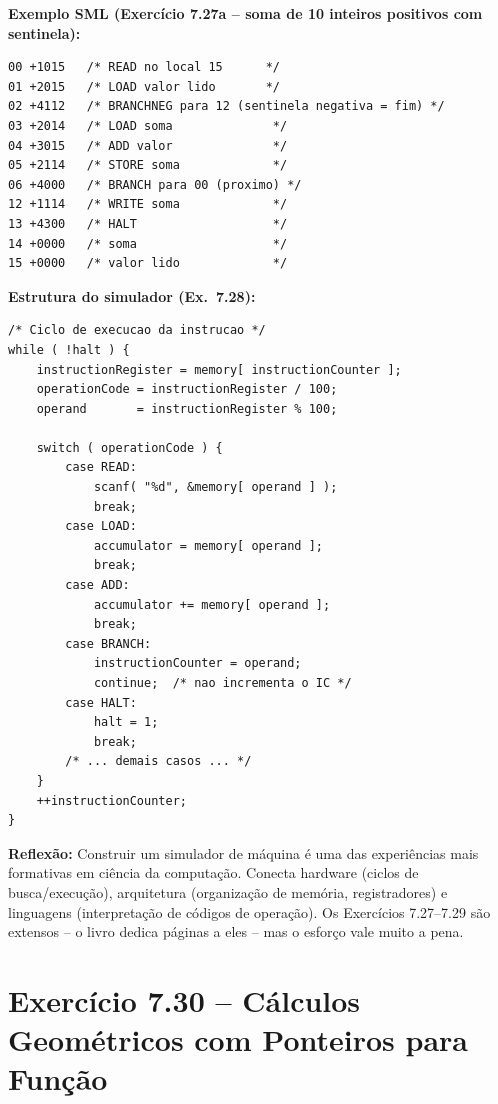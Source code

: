\documentclass[12pt,a4paper]{article}
\begin{document}
\begin{respostabox}
\textbf{Exemplo SML (Exercício 7.27a -- soma de 10 inteiros positivos com sentinela):}
\begin{lstlisting}
00 +1015   /* READ no local 15      */
01 +2015   /* LOAD valor lido       */
02 +4112   /* BRANCHNEG para 12 (sentinela negativa = fim) */
03 +2014   /* LOAD soma              */
04 +3015   /* ADD valor              */
05 +2114   /* STORE soma             */
06 +4000   /* BRANCH para 00 (proximo) */
12 +1114   /* WRITE soma             */
13 +4300   /* HALT                   */
14 +0000   /* soma                   */
15 +0000   /* valor lido             */
\end{lstlisting}

\textbf{Estrutura do simulador (Ex.\ 7.28):}
\begin{lstlisting}
/* Ciclo de execucao da instrucao */
while ( !halt ) {
    instructionRegister = memory[ instructionCounter ];
    operationCode = instructionRegister / 100;
    operand       = instructionRegister % 100;

    switch ( operationCode ) {
        case READ:
            scanf( "%d", &memory[ operand ] );
            break;
        case LOAD:
            accumulator = memory[ operand ];
            break;
        case ADD:
            accumulator += memory[ operand ];
            break;
        case BRANCH:
            instructionCounter = operand;
            continue;  /* nao incrementa o IC */
        case HALT:
            halt = 1;
            break;
        /* ... demais casos ... */
    }
    ++instructionCounter;
}
\end{lstlisting}

\textbf{Reflexão:} Construir um simulador de máquina é uma das experiências mais
formativas em ciência da computação. Conecta hardware (ciclos de busca/execução),
arquitetura (organização de memória, registradores) e linguagens (interpretação
de códigos de operação). Os Exercícios 7.27--7.29 são extensos -- o livro dedica
páginas a eles -- mas o esforço vale muito a pena.
\end{respostabox}

\newpage

\section{Exercício 7.30 -- Cálculos Geométricos com Ponteiros para Função}
\end{document}
